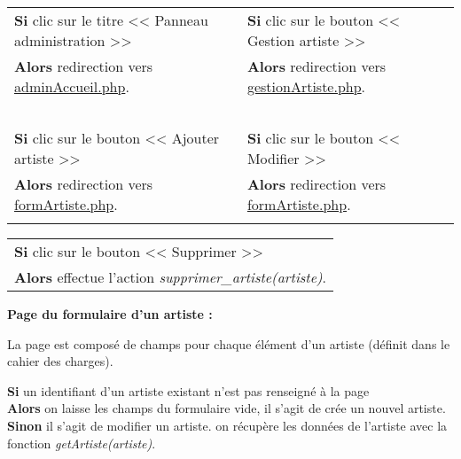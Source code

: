             \begin{center}
                \begin{tabular}{l | l}
                    \textbf{Si} clic sur le titre << Panneau administration >> & \textbf{Si} clic sur le bouton << Gestion artiste >> \\
                    \textbf{Alors} redirection vers \underline{adminAccueil.php}. & \textbf{Alors} redirection vers \underline{gestionArtiste.php}. \\ \\

                    \textbf{Si} clic sur le bouton << Ajouter artiste >> & \textbf{Si} clic sur le bouton << Modifier >> \\
                    \textbf{Alors} redirection vers \underline{formArtiste.php}. & \textbf{Alors} redirection vers \underline{formArtiste.php}. \\ \\
                \end{tabular}

                \begin{tabular}{l}
                    \textbf{Si} clic sur le bouton << Supprimer >> \\
                    \textbf{Alors} effectue l'action \emph{supprimer\_artiste(artiste)}.
                \end{tabular}
            \end{center}
            
            
            \begin{paragraphe}
                \textbf{Page du formulaire d'un artiste :}
            \end{paragraphe}
            
            \begin{paragraphe}
                La page est composé de champs pour chaque élément d'un artiste (définit dans le cahier des charges).
            \end{paragraphe}

            \begin{paragraphe}
                \textbf{Si} un identifiant d'un artiste existant n'est pas renseigné à la page \\
                \textbf{Alors} on laisse les champs du formulaire vide, il s'agit de crée un nouvel artiste. \\
                \textbf{Sinon} il s'agit de modifier un artiste. on récupère les données de l'artiste avec la fonction \emph{getArtiste(artiste)}.
            \end{paragraphe}
            
